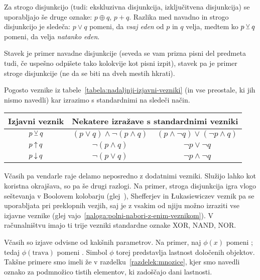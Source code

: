 Za strogo disjunkcijo (tudi: ekskluzivna disjunkcija, izključitvena disjunkcija) se uporabljajo še druge oznake: $p \oplus q$, $p + q$. Razlika med navadno in strogo disjunkcijo je sledeča: $p \lor q$ pomeni, da \emph{vsaj eden} od $p$ in $q$ velja, medtem ko $p \mathbin{\veebar} q$ pomeni, da velja \emph{natanko eden}.

\begin{zgled}
Stavek  je primer navadne disjunkcije (seveda se vam prizna pisni del predmeta tudi, če uspešno odpišete tako kolokvije kot pisni izpit), stavek  pa je primer stroge disjunkcije (ne da se biti na dveh mestih hkrati).
\end{zgled}

Pogosto veznike iz tabele~\ref{tabela:nadaljnji-izjavni-vezniki} (in vse preostale, ki jih nismo navedli) kar izrazimo s standardnimi na sledeči način.
\begin{center}
\begin{tabular}{|ccc|}
\hline
\textbf{Izjavni veznik} & \multicolumn{2}{c|}{\textbf{Nekatere izražave s standardnimi vezniki}} \\
\hline
$p \mathbin{\veebar} q$ & $(p \lor q) \land \lnot(p \land q)$ & $(p \land \lnot{q}) \lor (\lnot{p} \land q)$ \\
$p \mathbin{\uparrow} q$ & $\lnot(p \land q)$ & $\lnot{p} \lor \lnot{q}$ \\
$p \mathbin{\downarrow} q$ & $\lnot(p \lor q)$ & $\lnot{p} \land \lnot{q}$ \\
\hline
\end{tabular}
\end{center}

Včasih pa vendarle raje delamo neposredno z dodatnimi vezniki. Služijo lahko kot koristna okrajšava, so pa še drugi razlogi. Na primer, stroga disjunkcija igra vlogo seštevanja v Boolovem kolobarju (glej~), Shefferjev in Łukasiewiczev veznik pa se uporabljata pri preklopnih vezjih, saj je z vsakim od njiju možno izraziti vse izjavne veznike (glej vajo~\ref{naloga:polni-nabori-z-enim-veznikom}). V računalništvu imajo ti trije vezniki standardne oznake XOR, NAND, NOR.


Včasih so izjave odvisne od kakšnih parametrov. Na primer, naj $\phi(x)$ pomeni ; tedaj $\phi(\text{trava})$ pomeni . Simbol $\phi$ torej predstavlja lastnost določenih objektov. Takšne primere smo imeli že v razdelku~\ref{razdelek:mnozice}, kjer smo navedli oznako za podmnožico tistih elementov, ki zadoščajo dani lastnosti.

